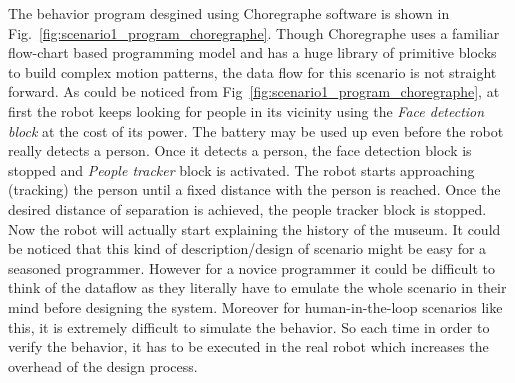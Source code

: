 The behavior program desgined using Choregraphe software is shown in Fig.~\ref{fig:scenario1_program_choregraphe}. Though Choregraphe uses a familiar flow-chart based programming model and has a huge library of primitive blocks to build complex motion patterns, the data flow for this scenario is not straight forward. As could be noticed from Fig~\ref{fig:scenario1_program_choregraphe}, at first the robot keeps looking for people in its vicinity using the \emph{Face detection block} at the cost of its power. The battery may be used up even before the robot really detects a person. Once it detects a person, the face detection block is stopped and \emph{People tracker} block is activated. The robot starts approaching (tracking) the person until a fixed distance with the person is reached. Once the desired distance of separation is achieved, the people tracker block is stopped. Now the robot will actually start explaining the history of the museum. It could be noticed that this kind of description/design of scenario might be easy for a seasoned programmer. However for a novice programmer it could be difficult to think of the dataflow as they literally have to emulate the whole scenario in their mind before designing the system. Moreover for human-in-the-loop scenarios like this, it is extremely difficult to simulate the behavior. So each time in order to verify the behavior, it has to be executed in the real robot which increases the overhead of the design process.

